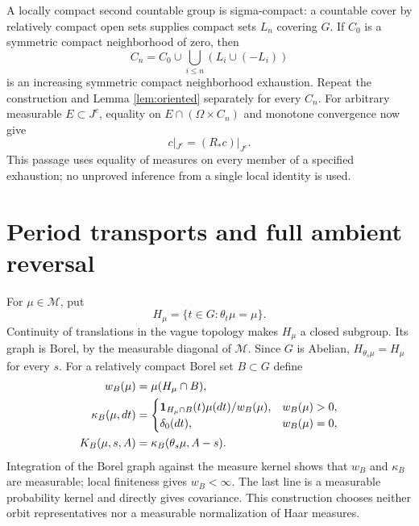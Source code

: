 \documentclass[11pt]{article}
\newcommand{\MM}{\mathcal M}
\newcommand{\ind}{\mathbf 1}
\begin{document}
A locally compact second countable group is sigma-compact: a countable cover by relatively compact open sets supplies compact sets $L_n$ covering $G$. If $C_0$ is a symmetric compact neighborhood of zero, then
\[
 C_n=C_0\cup\bigcup_{i\leq n}(L_i\cup(-L_i))
\]
is an increasing symmetric compact neighborhood exhaustion. Repeat the construction and Lemma \ref{lem:oriented} separately for every $C_n$. For arbitrary measurable $E\subset J^c$, equality on $E\cap(\Omega\times C_n)$ and monotone convergence now give
\begin{equation}
 c|_{J^c}=(R_*c)|_{J^c}. \label{eq:offperiod}
\end{equation}
This passage uses equality of measures on every member of a specified exhaustion; no unproved inference from a single local identity is used.

\section{Period transports and full ambient reversal}

For $\mu\in\MM$, put
\[
 H_\mu=\{t\in G:\theta_t\mu=\mu\}.
\]
Continuity of translations in the vague topology makes $H_\mu$ a closed subgroup. Its graph is Borel, by the measurable diagonal of $\MM$. Since $G$ is Abelian,
$H_{\theta_s\mu}=H_\mu$ for every $s$.
For a relatively compact Borel set $B\subset G$ define
\begin{align}
 w_B(\mu)&=\mu(H_\mu\cap B),\notag\\
 \kappa_B(\mu,dt)&=
 \begin{cases}
  \ind_{H_\mu\cap B}(t)\mu(dt)/w_B(\mu),&w_B(\mu)>0,\\
  \delta_0(dt),&w_B(\mu)=0,
 \end{cases}\notag\\
 K_B(\mu,s,A)&=\kappa_B(\theta_s\mu,A-s). \label{eq:periodkernel}
\end{align}
Integration of the Borel graph against the measure kernel shows that $w_B$ and $\kappa_B$ are measurable; local finiteness gives $w_B<\infty$. The last line is a measurable probability kernel and directly gives covariance. This construction chooses neither orbit representatives nor a measurable normalization of Haar measures.
\end{document}
